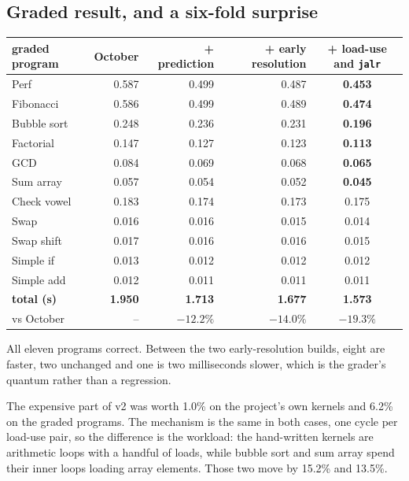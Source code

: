 \documentclass[11pt]{article}
\begin{document}
\subsection{Graded result, and a six-fold surprise}

\begin{center}
\begin{tabular}{lrrrc}
\toprule
graded program & October & + prediction & + early resolution & + load-use and \texttt{jalr} \\
\midrule
Perf        & 0.587 & 0.499 & 0.487 & \textbf{0.453} \\
Fibonacci   & 0.586 & 0.499 & 0.489 & \textbf{0.474} \\
Bubble sort & 0.248 & 0.236 & 0.231 & \textbf{0.196} \\
Factorial   & 0.147 & 0.127 & 0.123 & \textbf{0.113} \\
GCD         & 0.084 & 0.069 & 0.068 & \textbf{0.065} \\
Sum array   & 0.057 & 0.054 & 0.052 & \textbf{0.045} \\
Check vowel & 0.183 & 0.174 & 0.173 & 0.175 \\
Swap        & 0.016 & 0.016 & 0.015 & 0.014 \\
Swap shift  & 0.017 & 0.016 & 0.016 & 0.015 \\
Simple if   & 0.013 & 0.012 & 0.012 & 0.012 \\
Simple add  & 0.012 & 0.011 & 0.011 & 0.011 \\
\midrule
\textbf{total (s)} & \textbf{1.950} & \textbf{1.713} & \textbf{1.677} & \textbf{1.573} \\
vs October  & -- & $-12.2\%$ & $-14.0\%$ & $\mathbf{-19.3\%}$ \\
\bottomrule
\end{tabular}
\end{center}

All eleven programs correct. Between the two early-resolution builds, eight are faster, two
unchanged and one is two milliseconds slower, which is the grader's quantum rather than a
regression.

The expensive part of v2 was worth 1.0\% on the project's own kernels and 6.2\% on the graded
programs. The mechanism is the same in both cases, one cycle per load-use pair, so the
difference is the workload: the hand-written kernels are arithmetic loops with a handful of
loads, while bubble sort and sum array spend their inner loops loading array elements. Those two
move by 15.2\% and 13.5\%.
\end{document}
